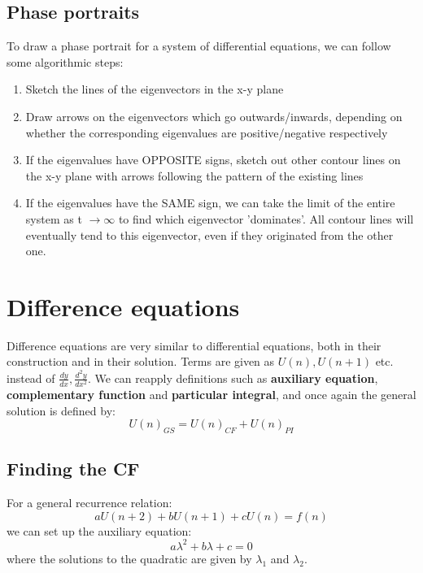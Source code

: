 \documentclass{scrartcl}
\begin{document}
\subsection{Phase portraits}

To draw a phase portrait for a system of differential equations, we can follow some algorithmic steps:
\begin{enumerate}
\item Sketch the lines of the eigenvectors in the x-y plane
\item Draw arrows on the eigenvectors which go outwards/inwards, depending on whether the corresponding eigenvalues are positive/negative respectively
\item If the eigenvalues have OPPOSITE signs, sketch out other contour lines on the x-y plane with arrows following the pattern of the existing lines
\item If the eigenvalues have the SAME sign, we can take the limit of the entire system as t $ \to \infty $ to find which eigenvector 'dominates'. All contour lines will eventually tend to this eigenvector, even if they originated from the other one.
\end{enumerate}

\section{Difference equations}

Difference equations are very similar to differential equations, both in their construction and in their solution. Terms are given as $ U(n), U(n+1) $ etc. instead of $ \frac{dy}{dx}, \frac{d^{2} y}{dx^{2}} $. We can reapply definitions such as \textbf{auxiliary equation}, \textbf{complementary function} and \textbf{particular integral}, and once again the general solution is defined by:
\begin{equation} \label{generalformdifference}
U(n)_{GS} = U(n)_{CF} + U(n)_{PI}
\end{equation}

\subsection{Finding the CF}

For a general recurrence relation:
\begin{equation}
aU(n+2) + bU(n+1) + cU(n) = f(n)
\end{equation}
we can set up the auxiliary equation:
\begin{equation}
a \lambda^{2} + b \lambda + c = 0
\end{equation}
where the solutions to the quadratic are given by $ \lambda_{1} $ and $ \lambda_{2} $.
\end{document}
